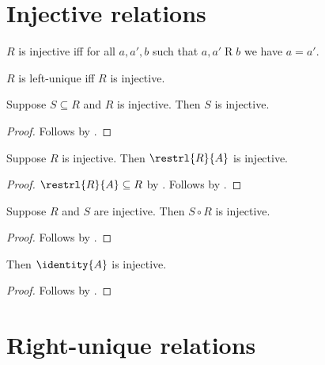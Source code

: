



\section{Injective relations}

\begin{definition}\label{injective}
    $R$ is injective iff for all $a,a',b$ such that $a, a'\mathrel{R} b$ we have $a = a'$.
\end{definition}

\begin{abbreviation}\label{leftunique}
    $R$ is left-unique iff $R$ is injective.
\end{abbreviation}

\begin{proposition}\label{subseteq_of_injective_is_injective}
    Suppose $S\subseteq R$ and $R$ is injective.
    Then $S$ is injective.
\end{proposition}
\begin{proof}
    Follows by .
\end{proof}

\begin{proposition}\label{restrl_injective}
    Suppose $R$ is injective.
    Then $\restrl{R}{A}$ is injective.
\end{proposition}
\begin{proof}
    $\restrl{R}{A}\subseteq R$ by .
    Follows by .
\end{proof}

\begin{proposition}\label{circ_injective}
    Suppose $R$ and $S$ are injective.
    Then $S\circ R$ is injective.
\end{proposition}
\begin{proof}
    Follows by .
\end{proof}

\begin{proposition}\label{identity_injective}
    Then $\identity{A}$ is injective.
\end{proposition}
\begin{proof}
    Follows by .
\end{proof}

\section{Right-unique relations}


